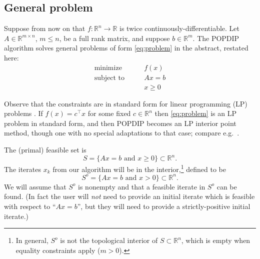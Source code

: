 \documentclass[11pt]{article}
\newcommand{\RR}{\mathbb{R}}
\begin{document}
\subsection*{General problem}

Suppose from now on that $f:\RR^n \to \RR$ is twice continuously-differentiable.  Let $A\in\RR^{m\times n}$, $m\le n$, be a full rank matrix, and suppose $b\in\RR^m$.  The POPDIP algorithm solves general problems of form \eqref{eq:problem} in the abstract, restated here:
\begin{equation}
\begin{matrix}
\text{minimize} \qquad   & f(x) \\
\text{subject to} \qquad & A x = b \\
                         & x \ge 0
\end{matrix} \tag{1}
\end{equation}

Observe that the constraints are in standard form for linear programming (LP) problems \cite[chapter 4]{GrivaNashSofer2009}.  If $f(x)=c^\top x$ for some fixed $c\in\RR^n$ then \eqref{eq:problem} is an LP problem in standard form, and then POPDIP becomes an LP interior point method, though one with no special adaptations to that case; compare e.g.~\cite{ZhangTapiaDennis1992}.

The (primal) feasible set is
\begin{equation}
S = \{Ax=b \text{ and } x\ge 0\} \subset \RR^n.  \label{eq:primalfeasible}
\end{equation}
The iterates $x_k$ from our algorithm will be in the interior,\footnote{In general, $S^o$ is not the topological interior of $S \subset \RR^n$, which is empty when equality constraints apply ($m>0$).} defined to be
\begin{equation}
S^o = \{Ax=b \text{ and } x > 0\} \subset \RR^n.  \label{eq:primalinterior}
\end{equation}
We will assume that $S^o$ is nonempty and that a feasible iterate in $S^o$ can be found.  (In fact the user will \emph{not} need to provide an initial iterate which is feasible with respect to ``$Ax=b$'', but they will need to provide a strictly-positive initial iterate.)
\end{document}
